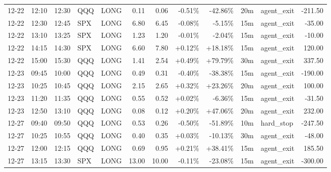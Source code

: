 \documentclass[11pt,a4paper]{article}
\begin{document}
\begin{center}
\begin{longtable}{>{\color{txtmain}}l l l l l r r r r r >{\color{txtmain}}l r}
12-22 & 12:10 & 12:30 & QQQ & LONG & 0.11 & 0.06 & \textcolor{lossred}{-0.51\%} & \textcolor{lossred}{-42.86\%} & 20m & agent\_exit & \textcolor{lossred}{-211.50} \\
12-22 & 12:30 & 12:45 & SPX & LONG & 6.80 & 6.45 & \textcolor{lossred}{-0.08\%} & \textcolor{lossred}{-5.15\%} & 15m & agent\_exit & \textcolor{lossred}{-35.00} \\
12-22 & 13:10 & 13:25 & SPX & LONG & 1.23 & 1.20 & \textcolor{lossred}{-0.01\%} & \textcolor{lossred}{-2.04\%} & 15m & agent\_exit & \textcolor{lossred}{-10.00} \\
12-22 & 14:15 & 14:30 & SPX & LONG & 6.60 & 7.80 & \textcolor{wingreen}{+0.12\%} & \textcolor{wingreen}{+18.18\%} & 15m & agent\_exit & \textcolor{wingreen}{120.00} \\
12-22 & 15:00 & 15:30 & QQQ & LONG & 1.41 & 2.54 & \textcolor{wingreen}{+0.49\%} & \textcolor{wingreen}{+79.79\%} & 30m & agent\_exit & \textcolor{wingreen}{337.50} \\
12-23 & 09:45 & 10:00 & QQQ & LONG & 0.49 & 0.31 & \textcolor{lossred}{-0.40\%} & \textcolor{lossred}{-38.38\%} & 15m & agent\_exit & \textcolor{lossred}{-190.00} \\
12-23 & 10:25 & 10:45 & QQQ & LONG & 2.15 & 2.65 & \textcolor{wingreen}{+0.32\%} & \textcolor{wingreen}{+23.26\%} & 20m & agent\_exit & \textcolor{wingreen}{100.00} \\
12-23 & 11:20 & 11:35 & QQQ & LONG & 0.55 & 0.52 & \textcolor{wingreen}{+0.02\%} & \textcolor{lossred}{-6.36\%} & 15m & agent\_exit & \textcolor{lossred}{-31.50} \\
12-23 & 12:50 & 13:10 & QQQ & LONG & 0.08 & 0.12 & \textcolor{wingreen}{+0.20\%} & \textcolor{wingreen}{+47.06\%} & 20m & agent\_exit & \textcolor{wingreen}{232.00} \\
12-27 & 09:40 & 09:50 & QQQ & LONG & 0.53 & 0.26 & \textcolor{lossred}{-0.50\%} & \textcolor{lossred}{-51.89\%} & 10m & hard\_stop & \textcolor{lossred}{-247.50} \\
12-27 & 10:25 & 10:55 & QQQ & LONG & 0.40 & 0.35 & \textcolor{wingreen}{+0.03\%} & \textcolor{lossred}{-10.13\%} & 30m & agent\_exit & \textcolor{lossred}{-48.00} \\
12-27 & 12:00 & 12:15 & QQQ & LONG & 0.69 & 0.95 & \textcolor{wingreen}{+0.21\%} & \textcolor{wingreen}{+38.41\%} & 15m & agent\_exit & \textcolor{wingreen}{185.50} \\
12-27 & 13:15 & 13:30 & SPX & LONG & 13.00 & 10.00 & \textcolor{lossred}{-0.11\%} & \textcolor{lossred}{-23.08\%} & 15m & agent\_exit & \textcolor{lossred}{-300.00} \\

\end{longtable}
\end{center}
\end{document}
